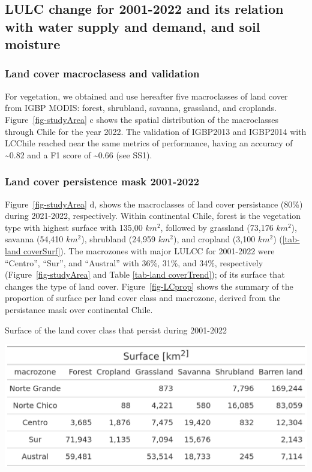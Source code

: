 \documentclass[
  number,
  preprint,
  3p,
  onecolumn]{elsarticle}
\begin{document}
\hypertarget{lulc-change-for-2001-2022-and-its-relation-with-water-supply-and-demand-and-soil-moisture}{%
\subsection{LULC change for 2001-2022 and its relation with water supply
and demand, and soil
moisture}\label{lulc-change-for-2001-2022-and-its-relation-with-water-supply-and-demand-and-soil-moisture}}

\hypertarget{land-cover-macroclasess-and-validation-1}{%
\subsubsection{Land cover macroclasess and
validation}\label{land-cover-macroclasess-and-validation-1}}

For vegetation, we obtained and use hereafter five macroclasses of land
cover from IGBP MODIS: forest, shrubland, savanna, grassland, and
croplands. Figure~\ref{fig-studyArea} c shows the spatial distribution
of the macroclasses through Chile for the year 2022. The validation of
IGBP2013 and IGBP2014 with LCChile reached near the same metrics of
performance, having an accuracy of \textasciitilde0.82 and a F1 score of
\textasciitilde0.66 (see SS1).

\hypertarget{sec-persistence_mask}{%
\subsubsection{Land cover persistence mask
2001-2022}\label{sec-persistence_mask}}

Figure~\ref{fig-studyArea} d, shows the macroclasses of land cover
persistance (80\%) during 2021-2022, respectively. Within continental
Chile, forest is the vegetation type with highest surface with 135,00
\(km^2\), followed by grassland (73,176 \(km^2\)), savanna (54,410
\(km^2\)), shrubland (24,959 \(km^2\)), and cropland (3,100 \(km^2\))
(\ref{tab-land coverSurf}). The macrozones with major LULCC for
2001-2022 were ``Centro'', ``Sur'', and ``Austral'' with 36\%, 31\%, and
34\%, respectively (Figure~\ref{fig-studyArea} and Table
\ref{tab-land coverTrend}); of its surface that changes the type of land
cover. Figure~\ref{fig-LCprop} shows the summary of the proportion of
surface per land cover class and macrozone, derived from the persistance
mask over continental Chile.

\begin{table}[!ht]
\caption{Surface of the land cover class that persist during 2001-2022}
\label{tab-land coverSurf}
\includegraphics[width = .5\textwidth]{../output/figs/table_surface_landcover_macrozone.png}
\end{table}
\end{document}
